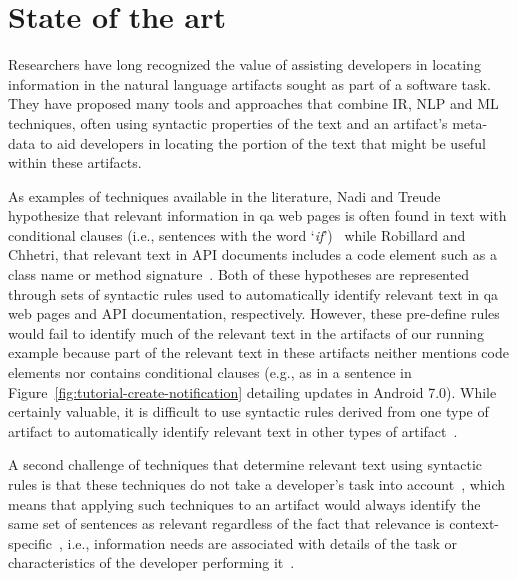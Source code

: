\section{State of the art}
\label{cp1:novelty}


Researchers have long recognized the value of 
assisting developers in locating information in the natural language artifacts sought as part of a software task.
They have proposed many tools and approaches 
that combine \acf{IR}, \acf{NLP} and \acf{ML} techniques,
often using  syntactic properties of the text and an artifact's meta-data
to aid developers in locating the portion of the text that
might be useful within these artifacts.






As examples of techniques available in the literature, Nadi and Treude hypothesize 
that relevant information in \acs{qa} 
web pages is often found in text with
conditional clauses (i.e., sentences with the word `\textit{if}')~\cite{nadi2020}
while Robillard and Chhetri, that relevant 
text in API documents includes a code element such as a class name or method signature~\cite{Robillard2015}.
Both of these hypotheses are 
represented through 
sets of syntactic rules 
used to automatically
identify relevant text in \acs{qa} web pages and API documentation, respectively.
However, these pre-define rules would fail to identify much of the relevant text in the artifacts of our running example
because part of the relevant text in these artifacts 
neither mentions code elements 
nor contains conditional clauses (e.g., as in a sentence in Figure~\ref{fig:tutorial-create-notification} detailing updates in Android 7.0).
While certainly valuable, 
it is difficult to use 
syntactic rules 
derived from one type of artifact
to automatically identify relevant text 
in other types of artifact~\cite{Bavota2016}.


% 


A second challenge of techniques that 
determine relevant text using syntactic rules is that 
these techniques do not take  a developer's task into account~\cite{Robillard2015}, which means that applying such 
techniques to an artifact would always identify 
the same set of sentences as relevant 
regardless of the fact that relevance is context-specific~\cite{Bavota2016}, i.e., information needs are associated with details of the task 
or characteristics of the developer performing it~\cite{Robillard2015}.



